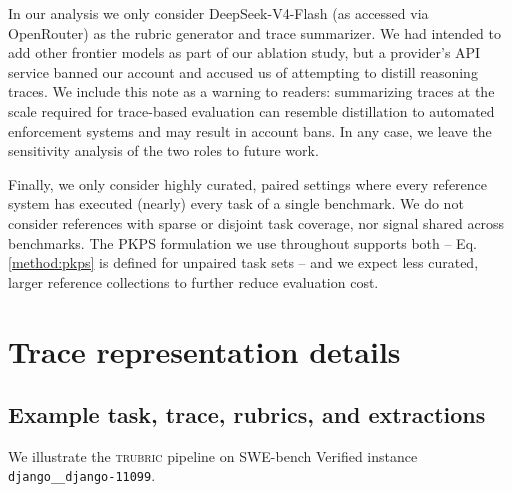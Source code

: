 \documentclass{article}
\newcommand{\trubric}{\textsc{trubric}}
\begin{document}
In our analysis we only consider DeepSeek-V4-Flash (as accessed via OpenRouter) as the rubric generator and trace summarizer.
We had intended to add other frontier models as part of our ablation study, but a provider's API service banned our account and accused us of attempting to distill reasoning traces.
We include this note as a warning to readers: summarizing traces at the scale required for trace-based evaluation can resemble distillation to automated enforcement systems and may result in account bans.
In any case, we leave the sensitivity analysis of the two roles to future work.

Finally, we only consider highly curated, paired settings where every reference system has executed (nearly) every task of a single benchmark.
We do not consider references with sparse or disjoint task coverage, nor signal shared across benchmarks.
The PKPS formulation we use throughout supports both -- Eq. \eqref{method:pkps} is defined for unpaired task sets -- and we expect less curated, larger reference collections to further reduce evaluation cost.




\appendix
\section{Trace representation details}
\label{app:traces}

\subsection{Example task, trace, rubrics, and extractions}
\label{app:example}

We illustrate the \trubric{} pipeline on SWE-bench Verified instance \texttt{django\_\_django-11099}.
\end{document}
